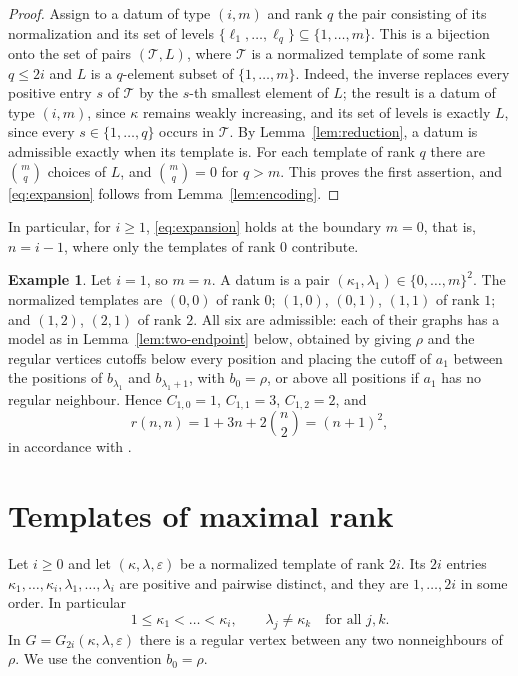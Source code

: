 \documentclass[11pt]{amsart}
\theoremstyle{definition}
\newtheorem{example}[theorem]{Example}
\theoremstyle{remark}
\numberwithin{equation}{section}
\begin{document}
\begin{proof}
Assign to a datum of type $(i,m)$ and rank $q$ the pair consisting of its normalization and its set of levels $\{\ell_1,\dots,\ell_q\}\subseteq\{1,\dots,m\}$. This is a bijection onto the set of pairs $(\mathcal T,L)$, where $\mathcal T$ is a normalized template of some rank $q\le2i$ and $L$ is a $q$-element subset of $\{1,\dots,m\}$. Indeed, the inverse replaces every positive entry $s$ of $\mathcal T$ by the $s$-th smallest element of $L$; the result is a datum of type $(i,m)$, since $\kappa$ remains weakly increasing, and its set of levels is exactly $L$, since every $s\in\{1,\dots,q\}$ occurs in $\mathcal T$. By Lemma~\ref{lem:reduction}, a datum is admissible exactly when its template is. For each template of rank $q$ there are $\binom{m}{q}$ choices of $L$, and $\binom{m}{q}=0$ for $q>m$. This proves the first assertion, and \eqref{eq:expansion} follows from Lemma~\ref{lem:encoding}.
\end{proof}

In particular, for $i\ge1$, \eqref{eq:expansion} holds at the boundary $m=0$, that is, $n=i-1$, where only the templates of rank $0$ contribute.

\begin{example}\label{ex:one}
Let $i=1$, so $m=n$. A datum is a pair $(\kappa_1,\lambda_1)\in\{0,\dots,m\}^2$. The normalized templates are $(0,0)$ of rank $0$; $(1,0)$, $(0,1)$, $(1,1)$ of rank $1$; and $(1,2)$, $(2,1)$ of rank $2$. All six are admissible: each of their graphs has a model as in Lemma~\ref{lem:two-endpoint} below, obtained by giving $\rho$ and the regular vertices cutoffs below every position and placing the cutoff of $a_1$ between the positions of $b_{\lambda_1}$ and $b_{\lambda_1+1}$, with $b_0=\rho$, or above all positions if $a_1$ has no regular neighbour. Hence $C_{1,0}=1$, $C_{1,1}=3$, $C_{1,2}=2$, and
\[
r(n,n)=1+3n+2\binom{n}{2}=(n+1)^2,
\]
in accordance with \cite[Proposition~12]{MX}.
\end{example}

\section{Templates of maximal rank}\label{sec:top}

Let $i\ge0$ and let $(\kappa,\lambda,\varepsilon)$ be a normalized template of rank $2i$. Its $2i$ entries $\kappa_1,\dots,\kappa_i,\lambda_1,\dots,\lambda_i$ are positive and pairwise distinct, and they are $1,\dots,2i$ in some order. In particular
\[
1\le\kappa_1<\dots<\kappa_i,\qquad\lambda_j\ne\kappa_k\quad\text{for all } j,k.
\]
In $G=G_{2i}(\kappa,\lambda,\varepsilon)$ there is a regular vertex between any two nonneighbours of $\rho$. We use the convention $b_0=\rho$.
\end{document}
